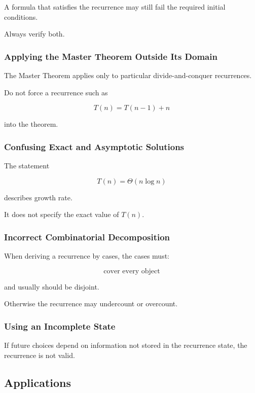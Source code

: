 A formula that satisfies the recurrence may still fail the required
initial conditions.

Always verify both.

\subsubsection{Applying the Master Theorem Outside Its Domain}

The Master Theorem applies only to particular divide-and-conquer
recurrences.

Do not force a recurrence such as

\[
T(n)=T(n-1)+n
\]

into the theorem.

\subsubsection{Confusing Exact and Asymptotic Solutions}

The statement

\[
T(n)=\Theta(n\log n)
\]

describes growth rate.

It does not specify the exact value of \(T(n)\).

\subsubsection{Incorrect Combinatorial Decomposition}

When deriving a recurrence by cases, the cases must:

\[
\boxed{
\text{cover every object}
}
\]

and usually should be disjoint.

Otherwise the recurrence may undercount or overcount.

\subsubsection{Using an Incomplete State}

If future choices depend on information not stored in the recurrence
state, the recurrence is not valid.

\subsection{Applications}
\label{subsec:recurrence-applications}

